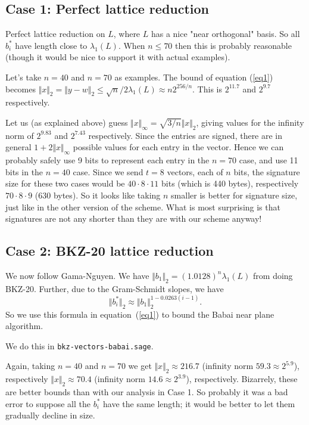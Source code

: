 \documentclass{llncs}
\begin{document}
\subsection{Case 1: Perfect lattice reduction}
Perfect lattice reduction on $L$, where $L$ has a nice "near orthogonal" basis. So all $b_i^*$ have length close to $\lambda_1(L)$. When $n \le 70$ then this is probably reasonable (though it would be nice to support it with actual examples).

Let's take $n=40$ and $n=70$ as examples.
The bound of equation (\ref{eq1}) becomes $\Vert x \Vert_2 =  \Vert y - w \Vert_2 \le \sqrt{n}/2 \lambda_1(L) \approx n 2^{256/n}$.
This is $2^{11.7}$ and $2^{9.7}$ respectively.

Let us (as explained above) guess $\Vert x \Vert_\infty = \sqrt{3/n} \Vert x \Vert_2 $, giving values for the infinity norm of $2^{9.83}$ and $2^{7.43}$ respectively.
Since the entries are signed, there are in general $1 + 2 \Vert x \Vert_\infty $ possible values for each entry in the vector. Hence we can probably safely use 9 bits to represent each entry in the $n=70$ case, and use 11 bits in the $n=40$ case.
Since we send $t=8$ vectors, each of $n$ bits, the signature size for these two cases would be
$40 \cdot 8 \cdot 11 $ bits (which is 440 bytes), respectively
 $70 \cdot 8 \cdot 9$ (630 bytes).
So it looks like taking $n$ smaller is better for signature size, just like in the other version of the scheme. 
What is most surprising is that signatures are not any shorter than they are with our scheme anyway!

\subsection{Case 2: BKZ-20 lattice reduction}
We now follow Gama-Nguyen.
We have $\Vert b_1 \Vert_2 = (1.0128)^n \lambda_1(L)$ from doing BKZ-20.
Further, due to the Gram-Schmidt slopes, we have
\[
   \Vert b_i^* \Vert_2 \approx \Vert b_1 \Vert_2^{1 - 0.0263(i-1)}.
\]
So we use this formula in equation~(\ref{eq1}) to bound the Babai near plane algorithm.

We do this in \texttt{bkz-vectors-babai.sage}.

Again, taking $n=40$ and $n=70$ we get
$\Vert x \Vert_2 \approx 216.7$ (infinity norm $59.3 \approx 2^{5.9}$), respectively
$\Vert x \Vert_2 \approx 70.4$ (infinity norm $14.6 \approx 2^{3.9} $), respectively.
Bizarrely, these are better bounds than with our analysis in Case 1. So probably it was a bad error to suppose all the $b_i^*$ have the same length; it would be better to let them gradually decline in size.
\end{document}
